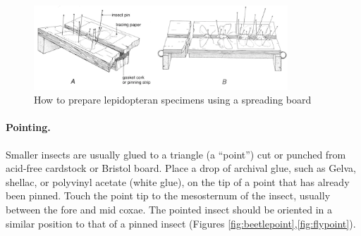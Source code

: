 \documentclass[letterpaper, 11pt]{article}
\begin{document}
\begin{figure}[ht!]
	\centering
  \includegraphics[width=0.85\textwidth]{LepSpreading}
  \caption{How to prepare lepidopteran specimens using a spreading board \citep[][Fig. 20]{USDAmanual1986}}
  \label{lepspread}
\end{figure}

\paragraph*{Pointing.} Smaller insects are usually glued to a triangle (a ``point'') cut or punched from acid-free cardstock or Bristol board. Place a drop of archival glue, such as Gelva, shellac, or polyvinyl acetate (white glue), on the tip of a point that has already been pinned. Touch the point tip to the mesosternum of the insect, usually between the fore and mid coxae. The pointed insect should be oriented in a similar position to that of a pinned insect (Figures \ref{fig:beetlepoint},\ref{fig:flypoint}).\\
\end{document}
